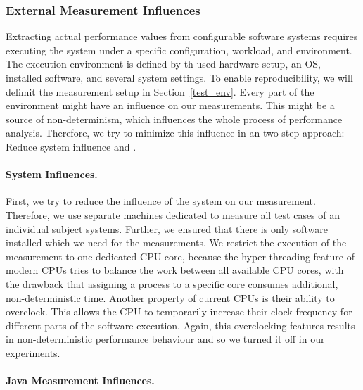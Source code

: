 \subsubsection{External Measurement Influences}

Extracting actual performance values from configurable software systems requires executing the system under a specific configuration, workload, and environment. The execution environment is defined by th used hardware setup, an \ac{OS}, installed software, and several system settings. To enable reproducibility, we will delimit the measurement setup in Section~\ref{test_env}. Every part of the environment might have an influence on our measurements. This might be a source of non-determinism, which influences the whole process of performance analysis. Therefore, we try to minimize this influence in an two-step approach: Reduce system influence and .

\paragraph{System Influences.}
\label{perf_measure_system}

First, we try to reduce the influence of the system on our measurement. Therefore, we use separate machines dedicated to measure all test cases of an individual subject systems. Further, we ensured that there is only software installed which we need for the measurements. We restrict the execution of the measurement to one dedicated CPU core, because the hyper-threading feature of modern CPUs tries to balance the work between all available CPU cores, with the drawback that assigning a process to a specific core consumes additional, non-deterministic time. Another property of current CPUs is their ability to overclock. This allows the CPU to temporarily increase their clock frequency for different parts of the software execution. Again, this overclocking features results in non-deterministic performance behaviour and so we turned it off in our experiments.


\paragraph{Java Measurement Influences.}
\label{perf_measure_java}

